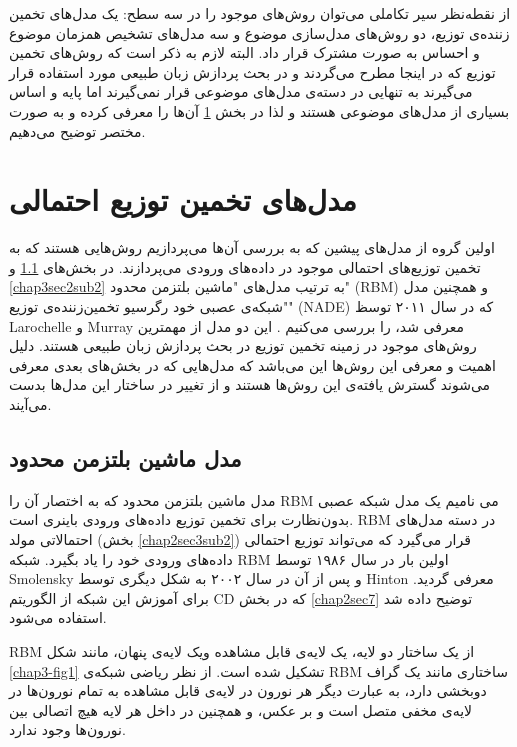 از نقطه‌نظر سیر تکاملی می‌‌توان روش‌های موجود را در سه‌ سطح: یک مدل‌های تخمین زننده‌ی توزیع، دو روش‌های مدل‌سازی موضوع و سه مدل‌های تشخیص همزمان موضوع و احساس به صورت مشترک قرار داد. البته لازم به ذکر است که روش‌های تخمین توزیع که در اینجا مطرح می‌‌گردند و در بحث پردازش زبان طبیعی مورد استفاده قرار می‌‌گیرند به تنهایی در دسته‌ی مدل‌های موضوعی قرار نمی‌‌گیرند اما پایه و اساس بسیاری از مدل‌های موضوعی هستند و لذا در بخش
\ref{sec2}
آن‌ها را معرفی‌ کرده و به صورت مختصر توضیح می‌‌دهیم.



\section{مدل‌های تخمین توزیع احتمالی}
\label{sec2}
اولین گروه از مدل‌های پیشین که به بررسی‌ آن‌ها می‌‌پردازیم روش‌هایی هستند که به تخمین توزیع‌های احتمالی‌ موجود در داده‌های ورودی می‌‌پردازند. در بخش‌های
\ref{chap3sec2sub1}
و
\ref{chap3sec2sub2}
به ترتیب مدل‌های "ماشین بلتزمن محدود"
(RBM)
\cite{smolensky1986information}\cite{freund1994unsupervised}\cite{hinton2002training}
 و همچنین مدل "شبکه‌‌ی عصبی خود رگرسیو تخمین‌زننده‌ی توزیع"
(NADE)
  که در سال
۲۰۱۱
توسظ 
Larochelle
و
Murray \cite{larochelle2011neural}
معرفی شد، را بررسی می‌کنیم . این دو مدل از مهمترین روش‌های موجود در زمینه تخمین توزیع در بحث پردازش زبان طبیعی هستند. دلیل اهمیت و معرفی‌ این روش‌ها این می‌‌‌باشد که مدل‌هایی که در بخش‌های بعدی معرفی‌ می‌‌شوند گسترش یافته‌ی این روش‌ها هستند و از تغییر در ساختار این مدل‌ها بدست می‌‌آیند.

	
	
	\subsection{مدل ماشین بلتزمن محدود}
	\label{chap3sec2sub1}
	مدل ماشین بلتزمن محدود که به اختصار آن را
	RBM
	می‌ نامیم یک مدل شبکه عصبی بدون‌نظارت برای تخمین توزیع داده‌های ورودی باینری است. 
	RBM
	در دسته مدل‌های احتمالاتی مولد
	 (بخش 
	 \ref{chap2sec3sub2})
	 قرار می‌‌گیرد که می‌‌تواند توزیع احتمالی‌ داده‌های ورودی خود را یاد بگیرد.
	 شبکه
	 RBM
	 اولین بار در سال ۱۹۸۶ توسط	  
	 Smolensky \cite{smolensky1986information}
	  و پس از آن در سال ۲۰۰۲ به شکل دیگری توسط
	 Hinton \cite{hinton2002training}
	  معرفی‌ گردید. برای آموزش این شبکه از الگوریتم
	 CD
	 که در بخش
	 \ref{chap2sec7}
	 توضیح داده شد استفاده می‌‌شود.
	 
	RBM
	 از یک ساختار دو لایه، یک لایه‌ی قابل مشاهده ویک لایه‌ی پنهان، مانند شکل
	\ref{chap3-fig1}
	تشکیل شده است.
 از نظر ریاضی‌ شبکه‌ی
	RBM
	ساختاری مانند یک گراف دوبخشی دارد، به عبارت دیگر هر نورون در لایه‌ی قابل مشاهده به تمام نورون‌ها در لایه‌ی مخفی‌ متصل است و بر عکس، و همچنین در داخل هر لایه هیچ اتصالی بین نورون‌ها وجود ندارد.
	
